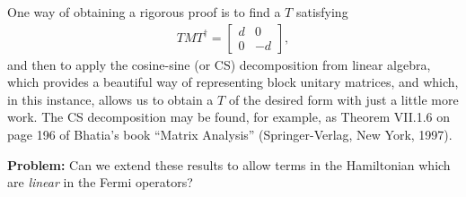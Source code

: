 \documentclass[12pt]{article}
\begin{document}
{One way of obtaining a rigorous proof is to find a $T$ satisfying
\begin{eqnarray}
  T M T^\dagger = \left[ \begin{array}{cc} d & 0 \\ 0 & -d \end{array} \right],
\end{eqnarray}
and then to apply the cosine-sine (or CS) decomposition from linear
algebra, which provides a beautiful way of representing block unitary
matrices, and which, in this instance, allows us to obtain a $T$ of
the desired form with just a little more work.  The CS decomposition
may be found, for example, as Theorem VII.1.6 on page 196 of Bhatia's
book ``Matrix Analysis'' (Springer-Verlag, New York, 1997).

\textbf{Problem:} Can we extend these results to allow terms in the
Hamiltonian which are \emph{linear} in the Fermi operators?




}
\end{document}
